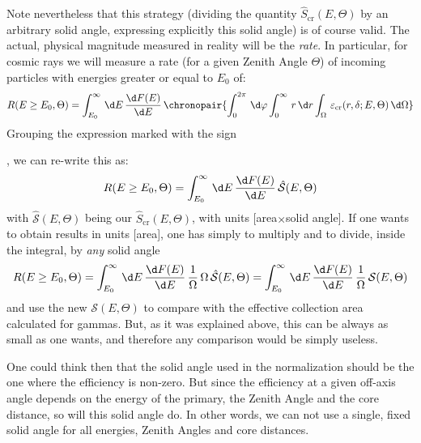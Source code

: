 Note nevertheless that this strategy (dividing the quantity
$\hat{S}_{\mathrm{cr}}(E,\Theta)$ by an arbitrary solid angle,
expressing explicitly this solid angle) is of course valid. The
actual, physical magnitude measured in reality will be the
\emph{rate}. In particular, for cosmic rays we will measure a rate
(for a given Zenith Angle $\Theta$) of incoming particles with
energies greater or equal to $E_0$ of:
%
\begin{equation}
  \label{eq:Rcr}
  R(E\ge E_0,\Theta) = 
  \int_{E_0}^{\infty}\,\d E\,\frac{\d F(E)}{\d E}\,
  \chronopair{
  \int_0^{2\pi}\,\d \varphi 
  \int_0^{\infty}\,r\,\d r 
  \int_{\Omega}\,\varepsilon_{\mathrm{cr}}(r,\delta;E,\Theta)\,\d \Omega}
\end{equation}
%
Grouping the expression marked with the sign
{\raisebox{6pt}{$\chronopair{\quad}$}\thickspace, we can re-write this
  as:
%
\begin{equation}
  \label{eq:Rcrbis}
  R(E\ge E_0,\Theta) = 
  \int_{E_0}^{\infty}\,\d E\,\frac{\d F(E)}{\d E}\,\hat{\mathcal{S}}(E,\Theta)
\end{equation}
%
with $\hat{\mathcal{S}}(E,\Theta)$ being our
$\hat{S}_{\mathrm{cr}}(E,\Theta)$, with units [area$\times$solid
angle]. If one wants to obtain results in units [area], one has simply
to multiply and to divide, inside the integral, by \emph{any} solid
angle
%
\begin{equation}
  \label{eq:Rcrtris}
  R(E\ge E_0,\Theta) = 
  \int_{E_0}^{\infty}\,\d E\,\frac{\d F(E)}{\d E}\,
  \frac{1}{\Omega}\,\Omega\,\hat{\mathcal{S}}(E,\Theta) =
  \int_{E_0}^{\infty}\,\d E\,\frac{\d F(E)}{\d E}\,
  \frac{1}{\Omega}\,\mathcal{S}(E,\Theta)
\end{equation}
%
and use the new $\mathcal{S}(E,\Theta)$ to compare with the effective
collection area calculated for gammas. But, as it was explained above,
this can be always as small as one wants, and therefore any comparison
would be simply useless.

One could think then that the solid angle used in the normalization
should be the one where the efficiency is non-zero. But since the
efficiency at a given off-axis angle depends on the energy of the
primary, the Zenith Angle and the core distance, so will this solid
angle do. In other words, we can not use a single, fixed solid angle
for all energies, Zenith Angles and core distances.

}
